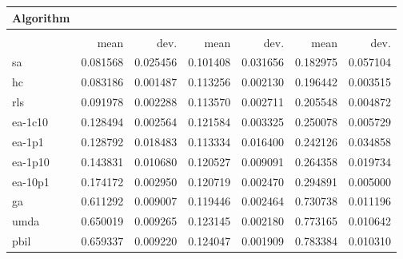 \begin{tabular}{@{} l *{6}{>{{}}N{1}{2}} @{}}
\toprule
{Algorithm} &  \\
\midrule
&  &  &  \\
\midrule
& {mean} & {dev.} & {mean} & {dev.} & {mean} & {dev.} \\
\midrule
sa & 0.081568 & 0.025456 & 0.101408 & 0.031656 & 0.182975 & 0.057104 \\
hc & 0.083186 & 0.001487 & 0.113256 & 0.002130 & 0.196442 & 0.003515 \\
rls & 0.091978 & 0.002288 & 0.113570 & 0.002711 & 0.205548 & 0.004872 \\
ea-1c10 & 0.128494 & 0.002564 & 0.121584 & 0.003325 & 0.250078 & 0.005729 \\
ea-1p1 & 0.128792 & 0.018483 & 0.113334 & 0.016400 & 0.242126 & 0.034858 \\
ea-1p10 & 0.143831 & 0.010680 & 0.120527 & 0.009091 & 0.264358 & 0.019734 \\
ea-10p1 & 0.174172 & 0.002950 & 0.120719 & 0.002470 & 0.294891 & 0.005000 \\
ga & 0.611292 & 0.009007 & 0.119446 & 0.002464 & 0.730738 & 0.011196 \\
umda & 0.650019 & 0.009265 & 0.123145 & 0.002180 & 0.773165 & 0.010642 \\
pbil & 0.659337 & 0.009220 & 0.124047 & 0.001909 & 0.783384 & 0.010310 \\
\bottomrule
\end{tabular}
